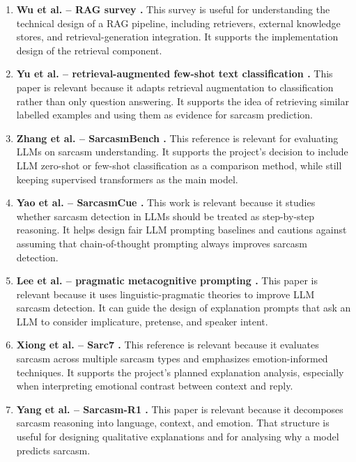 \documentclass[%
 reprint,
 amsmath,amssymb,
 aps,
]{revtex4-2}
\begin{document}
\begin{enumerate}[leftmargin=*, itemsep=0.65em]
\item \textbf{Wu et al. -- RAG survey \cite{wu2024rag}.} This survey is useful for understanding the technical design of a RAG pipeline, including retrievers, external knowledge stores, and retrieval-generation integration. It supports the implementation design of the retrieval component.

\item \textbf{Yu et al. -- retrieval-augmented few-shot text classification \cite{yu2023retrieval}.} This paper is relevant because it adapts retrieval augmentation to classification rather than only question answering. It supports the idea of retrieving similar labelled examples and using them as evidence for sarcasm prediction.

\item \textbf{Zhang et al. -- SarcasmBench \cite{zhang2024sarcasmbench}.} This reference is relevant for evaluating LLMs on sarcasm understanding. It supports the project's decision to include LLM zero-shot or few-shot classification as a comparison method, while still keeping supervised transformers as the main model.

\item \textbf{Yao et al. -- SarcasmCue \cite{yao2025sarcasmcue}.} This work is relevant because it studies whether sarcasm detection in LLMs should be treated as step-by-step reasoning. It helps design fair LLM prompting baselines and cautions against assuming that chain-of-thought prompting always improves sarcasm detection.

\item \textbf{Lee et al. -- pragmatic metacognitive prompting \cite{lee2025pragmatic}.} This paper is relevant because it uses linguistic-pragmatic theories to improve LLM sarcasm detection. It can guide the design of explanation prompts that ask an LLM to consider implicature, pretense, and speaker intent.

\item \textbf{Xiong et al. -- Sarc7 \cite{xiong2025sarc7}.} This reference is relevant because it evaluates sarcasm across multiple sarcasm types and emphasizes emotion-informed techniques. It supports the project's planned explanation analysis, especially when interpreting emotional contrast between context and reply.

\item \textbf{Yang et al. -- Sarcasm-R1 \cite{yang2025sarcasmr1}.} This paper is relevant because it decomposes sarcasm reasoning into language, context, and emotion. That structure is useful for designing qualitative explanations and for analysing why a model predicts sarcasm.


\end{enumerate}
\end{document}
